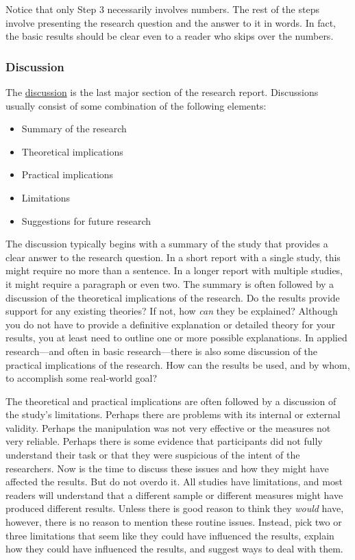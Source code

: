 \documentclass[
]{krantz}
\providecommand{\tightlist}{%
  \setlength{\itemsep}{0pt}\setlength{\parskip}{0pt}}
\begin{document}
Notice that only Step 3 necessarily involves numbers. The rest of the steps involve presenting the research question and the answer to it in words. In fact, the basic results should be clear even to a reader who skips over the numbers.

\subsubsection*{Discussion}\label{discussion}


The \hyperref[discussion]{discussion} is the last major section of the research report. Discussions usually consist of some combination of the following elements:

\begin{itemize}
\tightlist
\item
  Summary of the research
\item
  Theoretical implications
\item
  Practical implications
\item
  Limitations
\item
  Suggestions for future research
\end{itemize}

The discussion typically begins with a summary of the study that provides a clear answer to the research question. In a short report with a single study, this might require no more than a sentence. In a longer report with multiple studies, it might require a paragraph or even two. The summary is often followed by a discussion of the theoretical implications of the research. Do the results provide support for any existing theories? If not, how \emph{can} they be explained? Although you do not have to provide a definitive explanation or detailed theory for your results, you at least need to outline one or more possible explanations. In applied research---and often in basic research---there is also some discussion of the practical implications of the research. How can the results be used, and by whom, to accomplish some real-world goal?

The theoretical and practical implications are often followed by a discussion of the study's limitations. Perhaps there are problems with its internal or external validity. Perhaps the manipulation was not very effective or the measures not very reliable. Perhaps there is some evidence that participants did not fully understand their task or that they were suspicious of the intent of the researchers. Now is the time to discuss these issues and how they might have affected the results. But do not overdo it. All studies have limitations, and most readers will understand that a different sample or different measures might have produced different results. Unless there is good reason to think they \emph{would} have, however, there is no reason to mention these routine issues. Instead, pick two or three limitations that seem like they could have influenced the results, explain how they could have influenced the results, and suggest ways to deal with them.
\end{document}
